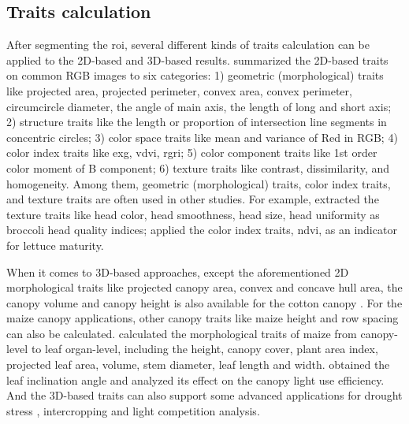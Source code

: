 \subsection{Traits calculation}

After segmenting the \gls{roi}, several different kinds of traits calculation can be applied to the 2D-based and 3D-based results. \citet[Table 1]{du_greenhouse_2021} summarized the 2D-based traits on common RGB images to six categories: 1) geometric (morphological) traits like projected area, projected perimeter, convex area, convex perimeter, circumcircle diameter, the angle of main axis, the length of long and short axis; 2) structure traits like the length or proportion of intersection line segments in concentric circles; 3) color space traits like mean and variance of Red in RGB; 4) color index traits like \gls{exg}, \gls{vdvi}, \gls{rgri}; 5) color component traits like 1st order color moment of B component; 6) texture traits like contrast, dissimilarity, and homogeneity. Among them, geometric (morphological) traits, color index traits, and texture traits are often used in other studies. For example, \citet{stansell_use_2017} extracted the texture traits like head color, head smoothness, head size, head uniformity as broccoli head quality indices; \citet{bauer_combining_2019} applied the color index traits, \gls{ndvi}, as an indicator for lettuce maturity. 

When it comes to 3D-based approaches, except the aforementioned 2D morphological traits like projected canopy area, convex and concave hull area, the canopy volume and canopy height is also available for the cotton canopy \citep{jiang_quantitative_2018}. For the maize canopy applications, other canopy traits like maize height \citep{hammerle_mobile_2018,qiu_field-based_2019} and row spacing \citep{qiu_field-based_2019} can also be calculated. \citet[Table 3]{jin_non-destructive_2020} calculated the morphological traits of maize from canopy-level to leaf organ-level, including the height, canopy cover, plant area index, projected leaf area, volume, stem diameter, leaf length and width. \citet{itakura_automatic_2018} obtained the leaf inclination angle and \citet{liu_canopy_2021} analyzed its effect on the canopy light use efficiency. And the 3D-based traits can also support some advanced applications for drought stress \citep{su_evaluating_2019, sorrentino_lettuce_2020}, intercropping \citep{liu_field-based_2021} and light competition \citep{zhu_quantification_2020} analysis.


